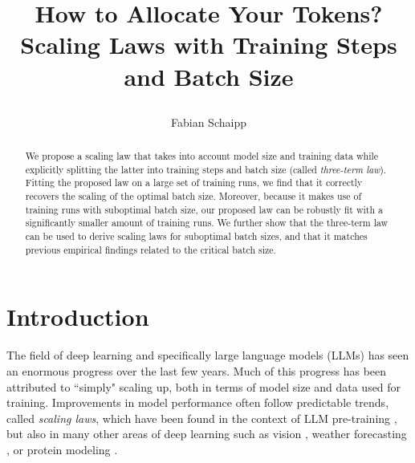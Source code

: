 \documentclass[12pt,a4paper,twoside]{article}
\title{{\LARGE\bf\sffamily How to Allocate Your Tokens? \\ \Large Scaling Laws with Training Steps and Batch Size \par}}
\author{Fabian Schaipp\footremember{myemail}{Corresponding email: \url{fabian.schaipp@inria.fr}}
\footremember{inria}{Inria, \'{E}cole Normale Sup\'{e}rieure, PSL Research University, Paris}
}
\date{}
\begin{document}
\maketitle

\begin{abstract}
    We propose a scaling law that takes into account model size and training data while explicitly splitting the latter into training steps and batch size (called \emph{three-term law}). Fitting the proposed law on a large set of training runs, we find that it correctly recovers the scaling of the optimal batch size. Moreover, because it makes use of training runs with suboptimal batch size, our proposed law can be robustly fit with a significantly smaller amount of training runs.
    We further show that the three-term law can be used to derive scaling laws for suboptimal batch sizes, and that it matches previous empirical findings related to the critical batch size.
\end{abstract}


\section{Introduction}

The field of deep learning and specifically large language models (LLMs) has seen an enormous progress over the last few years. Much of this progress has been attributed to ``simply" scaling up, both in terms of model size and data used for training. Improvements in model performance often follow predictable trends, called \emph{scaling laws}, which have been found in the context of LLM pre-training \citep{Kaplan2020,Hoffmann2022}, but also in many other areas of deep learning such as vision \citep{Zhai2022}, weather forecasting \citep{Bodnar2024}, or protein modeling \citep{Lin2023}.
\end{document}

